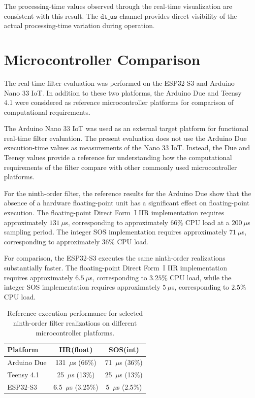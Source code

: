 The processing-time values observed through the real-time visualization are
consistent with this result. The $\texttt{dt\_us}$ channel provides direct
visibility of the actual processing-time variation during operation.


\section{Microcontroller Comparison}
\label{sec:microcontroller_comparison}

The real-time filter evaluation was performed on the ESP32-S3 and Arduino Nano
33 IoT. In addition to these two platforms, the Arduino Due and Teensy 4.1 were
considered as reference microcontroller platforms for comparison of
computational requirements.

The Arduino Nano 33 IoT was used as an external target platform for functional
real-time filter evaluation. The present evaluation does not use the Arduino
Due execution-time values as measurements of the Nano 33 IoT. Instead, the Due
and Teensy values provide a reference for understanding how the computational
requirements of the filter compare with other commonly used microcontroller
platforms.

For the ninth-order filter, the reference results for the Arduino Due show that
the absence of a hardware floating-point unit has a significant effect on
floating-point execution. The floating-point Direct Form~I IIR implementation
requires approximately $131~\mu$s, corresponding to approximately $66\%$ CPU
load at a $200~\mu$s sampling period. The integer SOS implementation requires
approximately $71~\mu$s, corresponding to approximately $36\%$ CPU load.

For comparison, the ESP32-S3 executes the same ninth-order realizations
substantially faster. The floating-point Direct Form~I IIR implementation
requires approximately $6.5~\mu$s, corresponding to $3.25\%$ CPU load, while
the integer SOS implementation requires approximately $5~\mu$s, corresponding
to $2.5\%$ CPU load.

\begin{table}[H]
    \centering
    \caption{Reference execution performance for selected ninth-order
        filter realizations on different microcontroller platforms.}
    \label{tab:mcu_comparison}
    \begin{tabular}{lcc}
        \toprule
        \textbf{Platform}   &
        \textbf{IIR(float)} &
        \textbf{SOS(int)}                                            \\
        \midrule
        Arduino Due         & 131~$\mu$s (66\%)   & 71~$\mu$s (36\%) \\
        Teensy 4.1          & 25~$\mu$s (13\%)    & 25~$\mu$s (13\%) \\
        ESP32-S3            & 6.5~$\mu$s (3.25\%) & 5~$\mu$s (2.5\%) \\
        \bottomrule
    \end{tabular}
\end{table}

